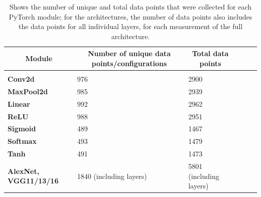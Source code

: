 \begin{table}[h]
    \caption{Shows the number of unique and total data points that were collected for each PyTorch module; for the architectures, the number of data points also includes the data points for all individual layers, for each measurement of the full architecture.}
    \label{tab:data-sets}
    \begin{center}
        \begin{tabular}{llllll}
        \multicolumn{1}{c}{\bf Module} & \multicolumn{1}{c}{\bf Number of unique data points/configurations}  & \multicolumn{1}{c}{\bf Total data points}
\\ \hline \\
\textbf{Conv2d}     & 976 & 2900 \\
\textbf{MaxPool2d}  & 985 & 2939 \\
\textbf{Linear}     & 992 & 2962 \\
\textbf{ReLU} & 988 & 2951 \\
\textbf{Sigmoid} & 489 & 1467 \\
\textbf{Softmax} & 493 & 1479 \\
\textbf{Tanh} & 491 & 1473 \\
\textbf{AlexNet, VGG11/13/16} & 1840 (including layers) &  5801 (including layers)\\
\end{tabular}
    \end{center}
\end{table}
%
\newpage
